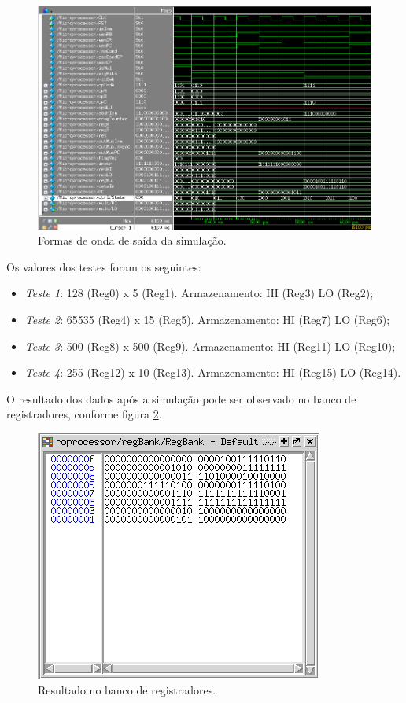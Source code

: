 \documentclass[11pt,a4paper,titlepage]{article}
\begin{document}
\begin{figure}[!h]
\centering
\includegraphics[scale=0.5]{images/sim.png}
\caption{Formas de onda de saída da simulação.}
\label{fig:modelsim}
\end{figure}

Os valores dos testes foram os seguintes:

\begin{itemize}
\item \textit{Teste 1}: 128 (Reg0) x 5 (Reg1). Armazenamento: HI (Reg3) LO (Reg2);
\item \textit{Teste 2}: 65535 (Reg4) x 15 (Reg5). Armazenamento: HI (Reg7) LO (Reg6);
\item \textit{Teste 3}: 500 (Reg8) x 500 (Reg9). Armazenamento: HI (Reg11) LO (Reg10);
\item \textit{Teste 4}: 255 (Reg12) x 10 (Reg13). Armazenamento: HI (Reg15) LO (Reg14).
\end{itemize}

O resultado dos dados após a simulação pode ser observado no banco de registradores, conforme figura \ref{fig:res}.

\begin{figure}[!h]
\centering
\includegraphics[scale=0.5]{images/res.png}
\caption{Resultado no banco de registradores.}
\label{fig:res}
\end{figure}
\end{document}

